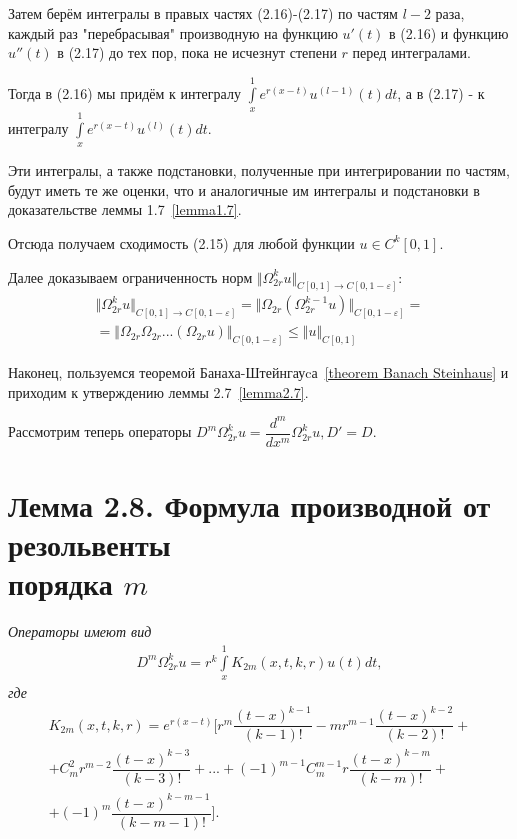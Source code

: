 Затем берём интегралы в правых частях (2.16)-(2.17) по частям $ l - 2 $ раза, каждый раз "перебрасывая" производную на функцию $ u'(t) $ в (2.16) и функцию $ u''(t) $ в (2.17) до тех пор, пока не исчезнут степени $ r $ перед интегралами.

Тогда в (2.16) мы придём к интегралу $ \int\limits_x^1 e^{r(x-t)}u^{(l-1)}(t)dt $, а в (2.17) - к интегралу $ \int\limits_x^1 e^{r(x-t)}u^{(l)}(t)dt $.

Эти интегралы, а также подстановки, полученные при интегрировании по частям, будут иметь те же оценки, что и аналогичные им интегралы и подстановки в доказательстве леммы 1.7~\eqref{lemma1.7}.

Отсюда получаем сходимость (2.15) для любой функции $ u \in C^k[0,1] $.

Далее доказываем ограниченность норм $ \Vert \Omega_{2r}^ku \Vert_{C[0,1] \rightarrow C[0,1-\varepsilon]} $:
\begin{equation}
\begin{array}{c}
\nonumber

\Vert \Omega_{2r}^ku \Vert_{C[0,1] \rightarrow C[0,1-\varepsilon]} = \Vert \Omega_{2r}(\Omega_{2r}^{k-1}u) \Vert_{C[0,1-\varepsilon]} = \\ = \Vert \Omega_{2r}\Omega_{2r}...(\Omega_{2r}u)\Vert_{C[0,1-\varepsilon]} \leq \Vert u \Vert_{C[0,1]}

\end{array}
\end{equation}

Наконец, пользуемся теоремой Банаха-Штейнгауcа~\eqref{theorem Banach Steinhaus} и приходим к утверждению леммы 2.7~\eqref{lemma2.7}.

Рассмотрим теперь операторы $ D^m\Omega_{2r}^ku = \dfrac{d^m}{dx^m}\Omega_{2r}^ku, D' = D $.

\section{Лемма 2.8. Формула производной от резольвенты \\ порядка $ m $}
\label{lemma2.8}

\textit{Операторы  имеют вид}
\begin{equation}
\begin{array}{c}

D^m\Omega_{2r}^ku = r^k\int\limits_x^1 K_{2m}(x,t,k,r)u(t)dt,

\end{array}
\end{equation}
\textit{где}
\begin{equation}
\begin{array}{c}

K_{2m}(x,t,k,r) = e^{r(x-t)} \biggl[ r^m\dfrac{(t-x)^{k-1}}{(k-1)!} - mr^{m-1}\dfrac{(t-x)^{k-2}}{(k-2)!} + \\ + C_m^2r^{m-2}\dfrac{(t-x)^{k-3}}{(k-3)!} + ... + (-1)^{m-1}C_m^{m-1}r\dfrac{(t-x)^{k-m}}{(k-m)!} + \\ + (-1)^m\dfrac{(t-x)^{k-m-1}}{(k-m-1)!}\biggr].

\end{array}
\end{equation}

